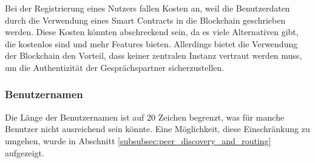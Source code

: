 Bei der Registrierung eines Nutzers fallen Kosten an, weil die Benutzerdaten durch die Verwendung eines Smart Contracts in die Blockchain geschrieben werden. Diese Kosten könnten abschreckend sein, da es viele Alternativen gibt, die kostenlos sind und mehr Features bieten. Allerdings bietet die Verwendung der Blockchain den Vorteil, dass keiner zentralen Instanz vertraut werden muss, um die Authentizität der Gesprächspartner sicherzustellen.


\subsubsection{Benutzernamen}

Die Länge der Benutzernamen ist auf $20$ Zeichen begrenzt, was für manche Benutzer nicht ausreichend sein könnte. Eine Möglichkeit, diese Einschränkung zu umgehen, wurde in Abschnitt \ref{subsubsec:peer_discovery_and_routing} \textit{} aufgezeigt.